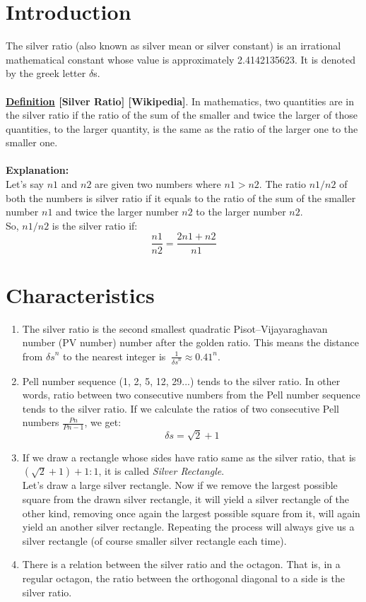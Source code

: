 \section{Introduction}
The silver ratio (also known as silver mean or silver constant) is an irrational mathematical constant whose value is approximately 2.4142135623. It is denoted by the greek letter $\delta$s. \\ \\
\textbf{\underline{Definition} [Silver Ratio] [Wikipedia]}. In mathematics, two quantities are in the silver ratio if the ratio of the sum of the smaller and twice the larger of those quantities, to the larger quantity, is the same as the ratio of the larger one to the smaller one\cite{demo}. \\ \\
\textbf{Explanation:} \\
Let's say $n1$ and $n2$ are given two numbers where $ n1 > n2 $. The ratio $n1/n2$ of both the numbers is silver ratio if it equals to the ratio of the sum of the smaller number $n1$ and twice the larger number $n2$ to the larger number $n2$. \\
So, $n1/n2$ is the silver ratio if: \\

\[\frac{n1}{n2}=\frac{2n1 + n2}{n1} \]
\section{Characteristics}
\begin{enumerate}

\item The silver ratio is the second smallest quadratic Pisot–Vijayaraghavan number (PV number) number after the golden ratio. This means the distance from \({\delta s}^n\) to the nearest integer is \(\ \frac{1}{{\delta s}^n}  \approx  {0.41}^n \).

  \item Pell number sequence (1, 2, 5, 12, 29...) tends to the silver ratio. In other words, ratio between two consecutive numbers from the Pell number sequence tends to the silver ratio. If we calculate the ratios of two consecutive Pell numbers \( \frac{Pn}{Pn-1} \), we get:
  \[  \delta s = \sqrt{2} + 1 \]
  
  \item If we draw a rectangle whose sides have ratio same as the silver ratio, that is \( (\sqrt{2} + 1) + 1 : 1\), it is called \emph{Silver Rectangle}. \\
Let's draw a large silver rectangle. Now if we remove the largest possible square from the drawn silver rectangle, it will yield a silver rectangle of the other kind, removing once again the largest possible square from it, will again yield an another silver rectangle. Repeating the process will always give us a silver rectangle (of course smaller silver rectangle each time).

 \item There is a relation between the silver ratio and the octagon. That is, in a regular octagon, the ratio between the orthogonal diagonal to a side is the silver ratio.
\end{enumerate}

